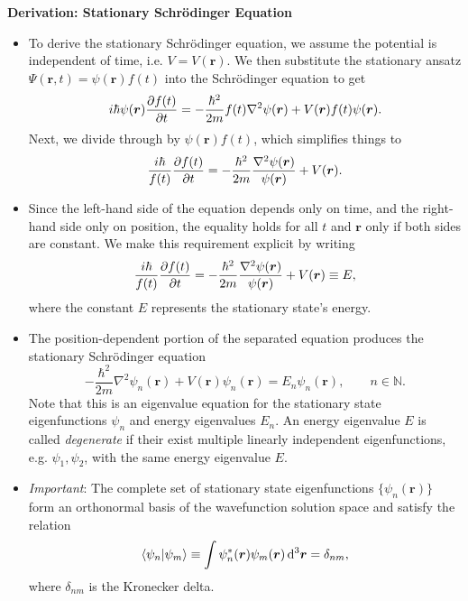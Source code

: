 \documentclass[11pt, a4paper]{article}
\newcommand{\diff}{\mathop{}\!\mathrm{d}} %
\newcommand{\dr}{\diff^{3} \r}  %
\renewcommand{\laplacian}{\nabla^{2}}
\newcommand{\Schro}{Schr\"{o}dinger\xspace}
\renewcommand{\vec}[1]{\bm{#1}}  %
\renewcommand{\r}{\vec{r}}  %
\newcommand{\p}{\psi}  %
\renewcommand{\P}{\Psi}  %
\begin{document}
\textbf{Derivation: Stationary \Schro Equation}
\begin{itemize}

    \item To derive the stationary \Schro equation, we assume the potential is independent of time, i.e. $ V = V(\r) $. We then substitute the stationary ansatz $ \P(\r, t) = \p(\r)f(t) $ into the \Schro equation to get
	\begin{equation*}
		i \hbar \p(\r) \pdv{f(t)}{t} = - \frac{\hbar^{2}}{2m} f(t) \laplacian \p(\r) + V(\r)f(t)\p(\r).
	\end{equation*}
	Next, we divide through by $ \p(\r)f(t) $, which simplifies things to
	\begin{equation*}
		\frac{i \hbar}{f(t)} \pdv{f(t)}{t} = - \frac{\hbar^{2}}{2m}\frac{\laplacian \p(\r)}{\p(\r)} + V(\r).
	\end{equation*}

	\item Since the left-hand side of the equation depends only on time, and the right-hand side only on position, the equality holds for all $ t $ and $ \r $ only if both sides are constant. We make this requirement explicit by writing
	\begin{equation*}
		\frac{i \hbar}{f(t)} \pdv{f(t)}{t} = - \frac{\hbar^{2}}{2m}\frac{\laplacian \p(\r)}{\p(\r)} + V(\r) \equiv E,
	\end{equation*}
	where the constant $ E $ represents the stationary state's energy. 

    \item The position-dependent portion of the separated equation produces the stationary \Schro equation
	\begin{equation*}
		-\frac{\hbar^{2}}{2m}\laplacian \p_{n}(\r) + V(\r) \p_{n}(\r) = E_{n}\p_{n}(\r), \qquad n \in \mathbb{N}.
	\end{equation*}
	Note that this is an eigenvalue equation for the stationary state eigenfunctions $ \p_{n} $ and energy eigenvalues $ E_{n} $. An energy eigenvalue $ E $ is called \textit{degenerate} if their exist multiple linearly independent eigenfunctions, e.g. $ \psi_{1}, \psi_{2} $, with the same energy eigenvalue $ E $. 

	\item \textit{Important}: The complete set of stationary state eigenfunctions $ \{\p_{n}(\r)\} $ form an orthonormal basis of the wavefunction solution space and satisfy the relation
	\begin{equation*}
        \ip{\psi_{n}}{\psi_{m}} \equiv \int \p^{*}_{n}(\r)  \p_{m}(\r) \dr = \delta_{nm},
	\end{equation*}
	where $ \delta_{nm} $ is the Kronecker delta. 
	


\end{itemize}
\end{document}
